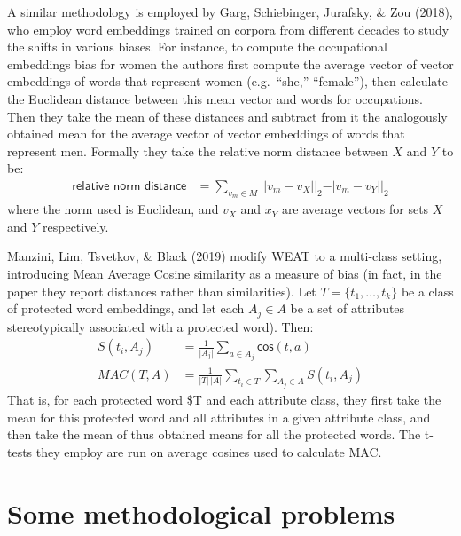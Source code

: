 \documentclass[
  10pt,
  dvipsnames,enabledeprecatedfontcommands, twocolumn]{scrartcl}
\begin{document}
A similar methodology is employed by Garg, Schiebinger, Jurafsky, \& Zou
(2018), who employ word embeddings trained on corpora from different
decades to study the shifts in various biases. For instance, to compute
the occupational embeddings bias for women the authors first compute the
average vector of vector embeddings of words that represent women
(e.g.~``she,'' ``female''), then calculate the Euclidean distance
between this mean vector and words for occupations. Then they take the
mean of these distances and subtract from it the analogously obtained
mean for the average vector of vector embeddings of words that represent
men. Formally they take the relative norm distance between \(X\) and
\(Y\) to be: \begin{align}
\textsf{relative norm distance} & = \sum_{v_m\in M} \vert \vert v_m - v_X\vert \vert_2 - \vert v_m - v_Y\vert \vert_2
\end{align} \noindent where the norm used is Euclidean, and \(v_X\) and
\(x_Y\) are average vectors for sets \(X\) and \(Y\) respectively.

Manzini, Lim, Tsvetkov, \& Black (2019) modify WEAT to a multi-class
setting, introducing Mean Average Cosine similarity as a measure of bias
(in fact, in the paper they report distances rather than similarities).
Let \(T = \{t_1, \dots, t_k\}\) be a class of protected word embeddings,
and let each \(A_j\in A\) be a set of attributes stereotypically
associated with a protected word). Then: \begin{align}
S(t_i, A_j) & = \frac{1}{\vert A_j\vert}\sum_{a\in A_j}\mathsf{cos}(t,a) \\
MAC(T,A) & = \frac{1}{\vert T \vert \,\vert A\vert}\sum_{t_i \in T }\sum_{A_j \in A} S(t_i,A_j)
\end{align} That is, for each protected word \$T and each attribute
class, they first take the mean for this protected word and all
attributes in a given attribute class, and then take the mean of thus
obtained means for all the protected words. The t-tests they employ are
run on average cosines used to calculate MAC.



\hypertarget{some-methodological-problems}{%
\section{Some methodological
problems}\label{some-methodological-problems}}
\end{document}
